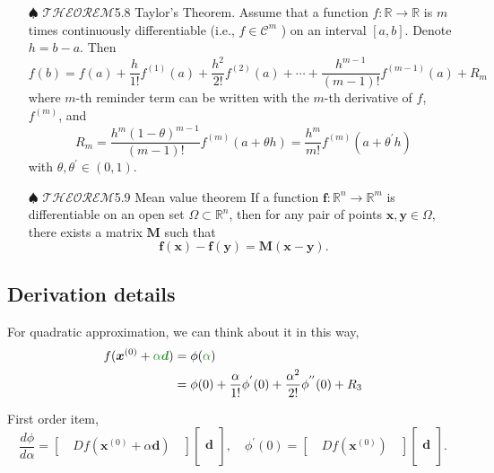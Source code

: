 \documentclass[12pt,thmsa]{article}
\begin{document}
\begin{itemize}
	\item[\(\spadesuit\)] \(\mathscr{THEOREM}\)5.8 Taylor's Theorem. 
	Assume that a function \(f: \mathbb{R} \rightarrow \mathbb{R}\) is \(m\) times continuously differentiable (i.e., \(f \in \mathcal{C}^{m}\) ) on an interval \([a, b]\). Denote \(h=b-a\). Then
	\[
	f(b)=f(a)+\frac{h}{1 !} f^{(1)}(a)+\frac{h^{2}}{2 !} f^{(2)}(a)+\cdots+\frac{h^{m-1}}{(m-1) !} f^{(m-1)}(a)+R_{m}
	\]
	where \(m\)-th reminder term can be written with the \(m\)-th derivative of \(f\), \(f^{(m)}\), and
	\[
	R_{m}=\frac{h^{m}(1-\theta)^{m-1}}{(m-1) !} f^{(m)}(a+\theta h)=\frac{h^{m}}{m !} f^{(m)}\left(a+\theta^{\prime} h\right)
	\]
	with \(\theta, \theta^{\prime} \in(0,1)\).
	
	
	\item[\(\spadesuit\)] \(\mathscr{THEOREM}\)5.9 Mean value theorem
	If a function \(\boldsymbol{f}: \mathbb{R}^{n} \rightarrow \mathbb{R}^{m}\) is differentiable on an open set \(\Omega \subset \mathbb{R}^{n}\), then for any pair of points \(\boldsymbol{x}, \boldsymbol{y} \in \Omega\), there exists a matrix \(\boldsymbol{M}\) such that
	\[
	\boldsymbol{f}(\boldsymbol{x})-\boldsymbol{f}(\boldsymbol{y})
	=\boldsymbol{M}(\boldsymbol{x}-\boldsymbol{y}).
	\]

\end{itemize}



\newpage
\subsection{Derivation details}

For quadratic approximation, we can think about it in this way,
\[\begin{aligned}
	f( \boldsymbol{x}^{(0)}+{\color{forestgreen}{\alpha} \boldsymbol{d}} ) &= \phi ({\color{forestgreen}{\alpha}}) \\
	&= \phi(0) + \frac{\alpha}{1!}\phi^{'}(0) + \frac{\alpha^{2}}{2!}\phi^{''}(0) + R_3 \end{aligned}
\]

	First order item,
	\[ \frac{d \phi}{d \alpha}=\left[ \quad D f\left( \boldsymbol{x}^{(0)} + \alpha \boldsymbol{d} \right) \quad \right] \left[
	\begin{array}{c} \\ \boldsymbol{d} \\ \\ \end{array}\right],
	\quad \phi^{'}(0)= \left[\quad D f\left(\boldsymbol{x}^{(0)} \right) \quad\right]\left[\begin{aligned} \\ \boldsymbol{d} \\  \\\end{aligned}\right]. \]
	
\end{document}
